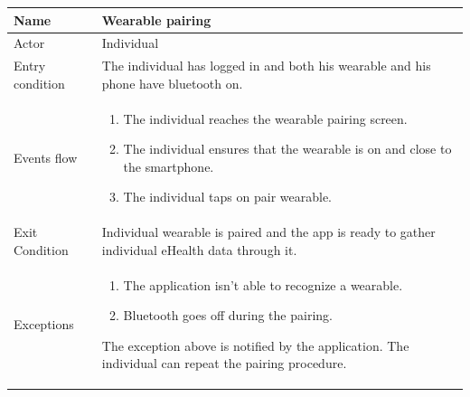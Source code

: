 \begin{table}[p]
\centering
\begin{tabular}{|l|p{11cm}|}
    \hline
    Name & Wearable pairing
    \\ \hline
    Actor & Individual
    \\ \hline 
    Entry condition & The individual has logged in and both his wearable and his phone have bluetooth on.
    \\ \hline
    Events flow &
    \begin{enumerate}
    \item The individual reaches the wearable pairing screen.
    \item The individual ensures that the wearable is on and close to the smartphone.
    \item The individual taps on pair wearable.
    \end{enumerate}
     \\ \hline
     Exit Condition & Individual wearable is paired and the app is ready to gather individual eHealth data through it.
     \\
    \hline
    Exceptions &
        \begin{enumerate}
    \item The application isn't able to recognize a wearable. 
   	\item Bluetooth goes off during the pairing.
    \end{enumerate}
    The exception above is notified by the application. The individual can repeat the pairing procedure.
      \\
    \hline

\end{tabular}
\end{table}


